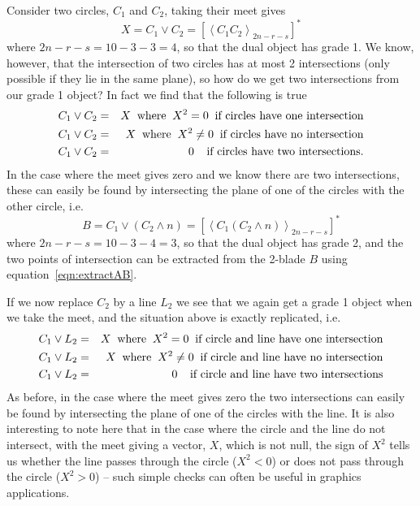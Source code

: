 Consider two circles, $C_1$ and $C_2$, taking their meet
gives
%
\begin{equation}
X = C_1 \vee C_2 = \left[\left< C_1 C_2
\right>_{2n-r-s}\right]^*
\end{equation}
%
where $2n-r-s=10-3-3=4$, so that the dual object has
grade 1. We know, however, that the intersection of two
circles has at most 2 intersections (only possible if
they lie in the same plane), so how do we get two
intersections from our grade 1 object? In fact we find
that the following is true
%
\begin{eqnarray}
C_1 \vee C_2  &  =  &  X \;\;\mbox{where}\;\;
X^2=0\;\;\mbox{if circles have one intersection} \nonumber \\
C_1 \vee C_2  &  =  &  X \;\;\mbox{where}\;\;
X^2\ne 0\;\;\mbox{if circles have no intersection} \nonumber \\
C_1 \vee C_2  &  =  &  0 \;\; \;\;\mbox{if circles have
two intersections}.
\end{eqnarray}
%
In the case where the meet gives zero and we know there
are two intersections, these can easily be found by
intersecting the plane of one of the circles with the
other circle, i.e.
%
\begin{equation}
B = C_1 \vee (C_2\wedge n) =  \left[\left< C_1 (C_2\wedge n)
\right>_{2n-r-s}\right]^*
\end{equation}
%
where $2n-r-s=10-3-4=3$, so that the dual object has
grade 2, and the two points of intersection can be
extracted from the 2-blade $B$ using
equation~\ref{eqn:extractAB}.

If we now replace $C_2$ by a line $L_2$ we see that we
again get a grade 1 object when we take the meet, and the
situation above is exactly replicated, i.e.
%
\begin{eqnarray}
C_1 \vee L_2  &  =  &  X \;\;\mbox{where}\;\;
X^2=0\;\;\mbox{if circle and line have one intersection} \nonumber \\
C_1 \vee L_2  &  =  &  X \;\;\mbox{where}\;\;
X^2\ne 0\;\;\mbox{if circle and line have no intersection} \nonumber \\
C_1 \vee L_2  &  =  &  0 \;\; \;\;\mbox{if circle and
line have two intersections}
\end{eqnarray}
%
As before, in the case where the meet gives zero the two
intersections can easily be found by intersecting the
plane of one of the circles with the line. It is also
interesting to note here that in the case where the
circle and the line do not intersect, with the meet
giving a vector, $X$, which is not null, the sign of
$X^2$ tells us whether the line passes through the circle
($X^2<0$) or does not pass through the circle ($X^2>0$)
-- such simple checks can often be useful in graphics
applications.


